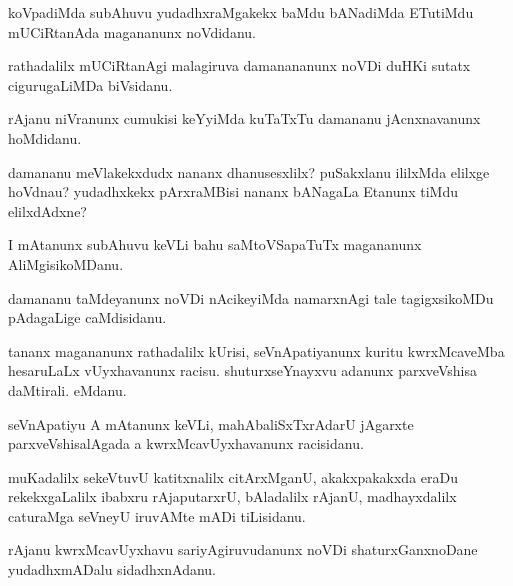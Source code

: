 \documentclass{article}
\begin{document}
\begin{mn}%
koVpadiMda subAhuvu yudadhxraMgakekx baMdu bANadiMda ETutiMdu mUCiRtanAda magananunx 
noVdidanu.
\end{mn}

\begin{mn}%
rathadalilx mUCiRtanAgi malagiruva damanananunx noVDi duHKi sutatx cigurugaLiMDa biVsidanu.
\end{mn}

\begin{mn}%
rAjanu niVranunx cumukisi keYyiMda kuTaTxTu damananu jAcnxnavanunx hoMdidanu.
\end{mn}

\begin{mn}%
damananu meVlakekxdudx nananx dhanusesxlilx? puSakxlanu ililxMda elilxge hoVdnau? 
yudadhxkekx pArxraMBisi nananx bANagaLa Etanunx tiMdu elilxdAdxne?
\end{mn}

\begin{mn}%
I mAtanunx subAhuvu keVLi bahu saMtoVSapaTuTx magananunx AliMgisikoMDanu.
\end{mn}

\begin{mn}%
damananu taMdeyanunx noVDi nAcikeyiMda namarxnAgi tale tagigxsikoMDu pAdagaLige caMdisidanu.
\end{mn}

\begin{mn}%
tananx magananunx rathadalilx kUrisi, seVnApatiyanunx kuritu kwrxMcaveMba hesaruLaLx 
vUyxhavanunx racisu. shuturxseYnayxvu adanunx parxveVshisa daMtirali. eMdanu.
\end{mn}

\begin{mn}%
seVnApatiyu A mAtanunx keVLi, mahAbaliSxTxrAdarU jAgarxte parxveVshisalAgada a 
kwrxMcavUyxhavanunx racisidanu.
\end{mn}

\begin{mn}%
muKadalilx sekeVtuvU katitxnalilx citArxMganU, akakxpakakxda  eraDu rekekxgaLalilx  
ibabxru rAjaputarxrU, bAladalilx rAjanU, madhayxdalilx caturaMga seVneyU iruvAMte mADi 
tiLisidanu.
\end{mn}

\begin{mn}%
rAjanu kwrxMcavUyxhavu sariyAgiruvudanunx noVDi shaturxGanxnoDane yudadhxmADalu 
sidadhxnAdanu.
\end{mn}

\end{document}
